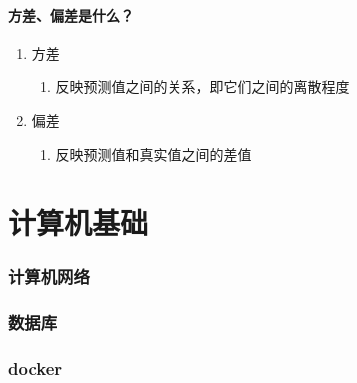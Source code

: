 \documentclass{paper}
\begin{document}
	\subsection{方差、偏差是什么？}
	\begin{enumerate}
		\item 方差
		\begin{enumerate}
			\item 反映预测值之间的关系，即它们之间的离散程度
		\end{enumerate} 
		\item 偏差
		\begin{enumerate}
			\item 反映预测值和真实值之间的差值
		\end{enumerate}
	\end{enumerate}
	
	\part{计算机基础}
	\section{计算机网络}
	\section{数据库}
	\section{docker}
\end{document}
